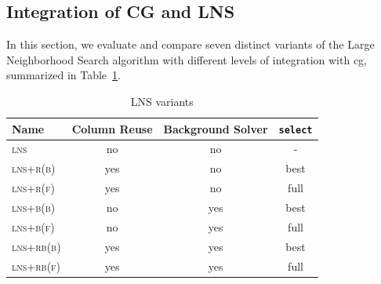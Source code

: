 \documentclass[]{amsart}
\newcommand{\size}{k}
\newcommand{\maxiter}{n_\textup{max}}
\newcommand{\tr}{$\omega_\textsc{tr}$\xspace}
\newcommand{\lns}{\textsc{lns}\xspace}
\theoremstyle{plain}
\begin{document}








%



\subsection{Integration of CG and LNS}


In this section, we evaluate and compare seven distinct variants of the Large Neighborhood Search algorithm with different levels of integration with \acrlong{cg}, summarized in Table~\ref{tab:lns_variants}. 

\begin{table}[htp]
    \caption{LNS variants}
    \label{tab:lns_variants}
    \centering
    \begin{tabular}{l*{3}{c}}
    \toprule
    Name & Column Reuse & Background Solver & \texttt{select} \\
    \midrule
     \lns & no & no & - \\
     \textsc{lns+r(b)} & yes & no & best \\
     \textsc{lns+r(f)} & yes & no & full \\
     \textsc{lns+b(b)} & no & yes & best \\
     \textsc{lns+b(f)} & no & yes & full \\
     \textsc{lns+rb(b)} & yes & yes & best \\
     \textsc{lns+rb(f)} & yes & yes & full \\
    \bottomrule
    \end{tabular}
\end{table}
\end{document}
